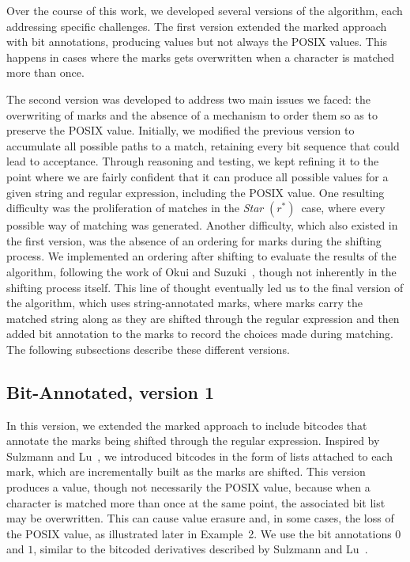\documentclass[12pt]{article}
\newcommand{\STARText}{\textit{Star} $(r^*)$}
\begin{document}
Over the course of this work, we developed several versions of the algorithm, each addressing specific challenges.  
The first version extended the marked approach with bit annotations, producing values but not always the POSIX values. 
This happens in cases where the marks gets overwritten when a character is matched more than once.

The second version was developed to address two main issues we faced: the overwriting of marks and the absence of a mechanism to order them 
so as to preserve the POSIX value. Initially, we modified the previous version to accumulate all possible paths to a match, retaining 
every bit sequence that could lead to acceptance. Through reasoning and testing, we kept refining it to the point where we are fairly confident 
that it can produce all possible values for a given string and regular expression, including the POSIX value.  
One resulting difficulty was the proliferation of matches in the \STARText\ case, where every possible way of matching was generated.  
Another difficulty, which also existed in the first version, was the absence of an ordering for marks during the shifting process.  
We implemented an ordering after shifting to evaluate the results of the algorithm, following the work of Okui and Suzuki~\cite{OkuiSuzuki2013}, 
though not inherently in the shifting process itself. This line of thought eventually led us to the final version of the algorithm, which uses 
string-annotated marks, where marks carry the matched string along as they are shifted through the regular expression and then added bit annotation to the marks
to record the choices made during matching.
The following subsections describe these different versions.

\subsection{Bit-Annotated, version 1}

In this version, we extended the marked approach to include bitcodes that annotate the marks being 
shifted through the regular expression. Inspired by Sulzmann and Lu~\cite{Sulzmann2014}, we introduced bitcodes in the form 
of lists attached to each mark, which are incrementally built as the marks are shifted.  
This version produces a value, though not necessarily the POSIX value, because when a character is matched 
more than once at the same point, the associated bit list may be overwritten.  
This can cause value erasure and, in some cases, the loss of the POSIX value, as illustrated later in Example~2.  
We use the bit annotations $0$ and $1$, similar to the bitcoded derivatives described by Sulzmann and Lu~\cite{Sulzmann2014}.  
\end{document}
